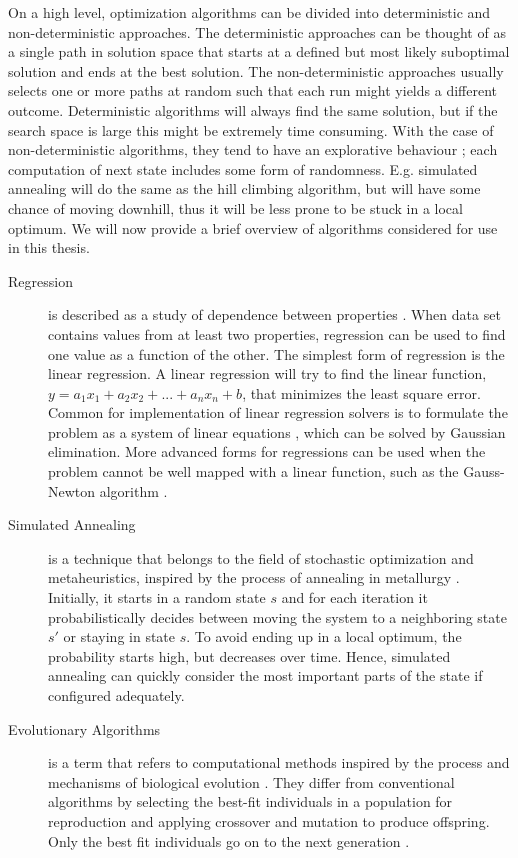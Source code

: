 On a high level, optimization algorithms can be divided into deterministic and
non-deterministic approaches. The deterministic approaches can be thought of as
a single path in solution space that starts at a defined but most likely
suboptimal solution and ends at the best solution. The non-deterministic
approaches usually selects one or more paths at random such that each run might
yields a different outcome. Deterministic algorithms will always find the same
solution, but if the search space is large this might be extremely time
consuming. With the case of non-deterministic algorithms, they tend to have
an explorative behaviour \cite{poli2008field}; each computation of next state
includes some form of randomness. E.g. simulated annealing will do the same as
the hill climbing algorithm, but will have some chance of moving downhill, thus
it will be less prone to be stuck in a local optimum. We will now provide a brief
overview of algorithms considered for use in this thesis.


\begin{description}
    \item[Regression] is described as a study of dependence between properties
        \cite{weisberg2005applied}. When data set contains values from at
        least two properties, regression can be used to find one value as a
        function of the other. The simplest form of regression is the linear
        regression. A linear regression will try to find the linear function,
        $y=a_1x_1+a_2x_2+...+a_nx_n+b$, that minimizes the least square error.
        Common for implementation of linear regression solvers is to formulate
        the problem as a system of linear equations \cite{lay2011linear}, which
        can be solved by Gaussian elimination. More advanced forms for
        regressions can be used when the problem cannot be well mapped with a
        linear function, such as the Gauss-Newton algorithm
        \cite{myers1990classical}.

    \item[Simulated Annealing] is a technique that belongs to the field of
        stochastic optimization and metaheuristics, inspired by the process of
        annealing in metallurgy \cite{van1987simulated}. Initially, it starts in
        a random state $s$ and for each iteration it probabilistically decides
        between moving the system to a neighboring state $s'$ or staying in
        state $s$. To avoid ending up in a local optimum, the probability starts
        high, but decreases over time. Hence, simulated annealing can quickly
        consider the most important parts of the state if configured adequately.

    \item[Evolutionary Algorithms] is a term that refers to computational
        methods inspired by the process and mechanisms of biological evolution
        \cite{fogel1997evolutionary}.  They differ from conventional algorithms
        by selecting the best-fit individuals in a population for reproduction
        and applying crossover and mutation to produce offspring. Only the best
        fit individuals go on to the next generation \cite{introtoga}.

\end{description}

